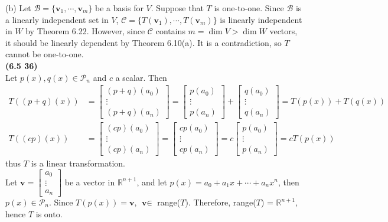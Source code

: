 (b) 
Let $\mathcal{B} = \{\textbf{v}_1, \cdots, \textbf{v}_m\}$ be a basis for $V$. Suppose that $T$ is one-to-one. Since $\mathcal{B}$ is a linearly independent set in $V$, $\mathcal{C} = \{T(\textbf{v}_1), \cdots, T(\textbf{v}_m)\}$ is linearly independent in $W$ by Theorem 6.22. However, since $\mathcal{C}$ contains $m = \dim V > \dim W$ vectors, it should be linearly dependent by Theorem 6.10(a). It is a contradiction, so $T$ cannot be one-to-one. \\

\textbf{(6.5 36)} \\
Let $p(x), q(x) \in \mathscr{P}_n$ and $c$ a scalar. Then \begin{align*}
	T((p + q)(x)) &= \begin{bmatrix}
		(p + q)(a_0) \\ \vdots \\ (p + q)(a_n)
	\end{bmatrix} = \begin{bmatrix}
		p(a_0) \\ \vdots \\ p(a_n)
	\end{bmatrix} + \begin{bmatrix}
		q(a_0) \\ \vdots \\ q(a_n)
	\end{bmatrix} = T(p(x)) + T(q(x)) \\
	T((cp)(x)) &= \begin{bmatrix}
		(cp)(a_0) \\ \vdots \\ (cp)(a_n)
	\end{bmatrix} = \begin{bmatrix}
		cp(a_0) \\ \vdots \\ cp(a_n)
	\end{bmatrix} = c\begin{bmatrix}
		p(a_0) \\ \vdots \\ p(a_n)
	\end{bmatrix} = cT(p(x))
\end{align*} thus $T$ is a linear transformation. \\

Let $\textbf{v} = \begin{bmatrix}
	a_0 \\ \vdots \\ a_n
\end{bmatrix}$ be a vector in $\mathbb{R}^{n+1}$, and let $p(x) = a_0 + a_1x + \cdots + a_nx^n$, then $p(x) \in \mathscr{P}_n$. Since $T(p(x)) = \textbf{v}$, $\textbf{v} \in $ range($T$). Therefore, range($T$) = $\mathbb{R}^{n+1}$, hence $T$ is onto. \\

